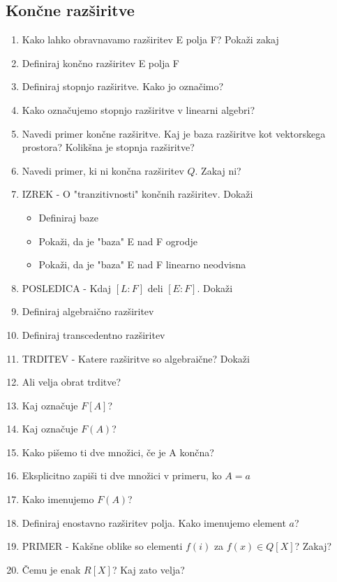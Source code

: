 \documentclass{article}
\begin{document}
    \subsection{Končne razširitve}
    \begin{enumerate}
        \item Kako lahko obravnavamo razširitev E polja F? Pokaži zakaj
        \item Definiraj končno razširitev E polja F
        \item Definiraj stopnjo razširitve. Kako jo označimo?
        \item Kako označujemo stopnjo razširitve v linearni algebri?
        \item Navedi primer končne razširitve. Kaj je baza razširitve kot vektorskega prostora? Kolikšna je stopnja razširitve?
        \item Navedi primer, ki ni končna razširitev $Q$. Zakaj ni?
        \item IZREK - O "tranzitivnosti" končnih razširitev. Dokaži
        \begin{itemize}
            \item Definiraj baze
            \item Pokaži, da je "baza" E nad F ogrodje
            \item Pokaži, da je "baza" E nad F linearno neodvisna
        \end{itemize}
        \item POSLEDICA - Kdaj $[L:F]$ deli $[E:F]$. Dokaži
        \item Definiraj algebraično razširitev
        \item Definiraj transcedentno razširitev
        \item TRDITEV - Katere razširitve so algebraične? Dokaži
        \item Ali velja obrat trditve?
        \item Kaj označuje $F[A]$?
        \item Kaj označuje $F(A)$?
        \item Kako pišemo ti dve množici, če je A končna?
        \item Eksplicitno zapiši ti dve množici v primeru, ko $A = {a}$
        \item Kako imenujemo $F(A)$?
        \item Definiraj enostavno razširitev polja. Kako imenujemo element $a$?
        \item PRIMER - Kakšne oblike so elementi $f(i)$ za $f(x) \in Q[X]$? Zakaj?
        \item Čemu je enak $R[X]$? Kaj zato velja?

\end{enumerate}
\end{document}
